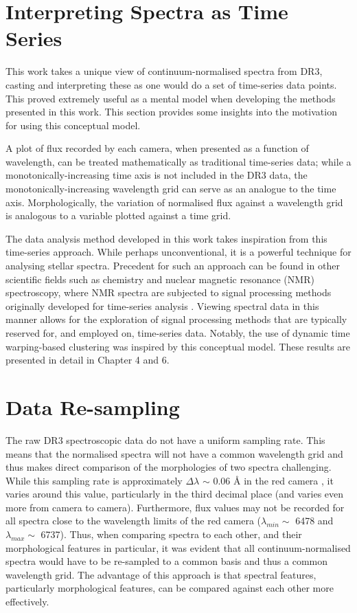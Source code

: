 \section{Interpreting Spectra as Time Series}

This work takes a unique view of continuum-normalised spectra from DR3, casting and interpreting these as one would do a set of time-series data points. This proved extremely useful as a mental model when developing the methods presented in this work. This section provides some insights into the motivation for using this conceptual model. 

A plot of flux recorded by each camera, when presented as a function of wavelength, can be treated mathematically as traditional time-series data; while a monotonically-increasing time axis is not included in the DR3 data, the monotonically-increasing wavelength grid can serve as an analogue to the time axis. Morphologically, the variation of normalised flux against a wavelength grid is analogous to a variable plotted against a time grid.

The data analysis method developed in this work takes inspiration from this time-series approach. While perhaps unconventional, it is a powerful technique for analysing stellar spectra. Precedent for such an approach can be found in other scientific fields such as chemistry and nuclear magnetic resonance (NMR) spectroscopy, where NMR spectra are subjected to signal processing methods originally developed for time-series analysis \citep{nielsen2019practical}. Viewing spectral data in this manner allows for the exploration of signal processing methods that are typically reserved for, and employed on, time-series data. Notably, the use of dynamic time warping-based clustering was inspired by this conceptual model. These results are presented in detail in Chapter 4 and 6.

\section{Data Re-sampling}

The raw DR3 spectroscopic data do not have a uniform sampling rate. This means that the normalised spectra will not have a common wavelength grid and thus makes direct comparison of the morphologies of two spectra challenging. While this sampling rate is approximately $\Delta\lambda$ $\sim$ 0.06 \r{A} in the red camera \citep{vcotar2021galah}, it varies around this value, particularly in the third decimal place (and varies even more from camera to camera). Furthermore, flux values may not be recorded for all spectra close to the wavelength limits of the red camera ($\lambda_{min} \sim$ 6478 and $\lambda_{max} \sim$ 6737). Thus, when comparing spectra to each other, and their morphological features in particular, it was evident that all continuum-normalised spectra would have to be re-sampled to a common basis and thus a common wavelength grid. The advantage of this approach is that spectral features, particularly morphological features, can be compared against each other more effectively.

